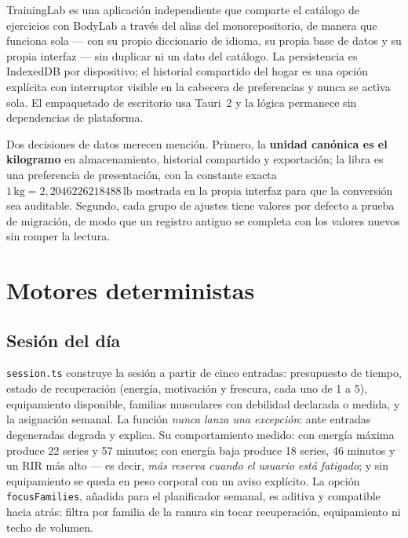 \documentclass[conference]{IEEEtran}
\newcommand{\code}[1]{\texttt{\small #1}}
\begin{document}
TrainingLab es una aplicaci\'on independiente que comparte el cat\'alogo de
ejercicios con BodyLab a trav\'es del alias del monorepositorio, de manera que
funciona sola --- con su propio diccionario de idioma, su propia base de datos y
su propia interfaz --- sin duplicar ni un dato del cat\'alogo. La persistencia es
IndexedDB por dispositivo; el historial compartido del hogar es una opci\'on
expl\'icita con interruptor visible en la cabecera de preferencias y nunca se
activa sola. El empaquetado de escritorio usa Tauri~2 y la l\'ogica permanece
sin dependencias de plataforma.

Dos decisiones de datos merecen menci\'on. Primero, la \textbf{unidad can\'onica
es el kilogramo} en almacenamiento, historial compartido y exportaci\'on; la
libra es una preferencia de presentaci\'on, con la constante exacta
$1\,\text{kg} = 2{,}2046226218488\,\text{lb}$ mostrada en la propia interfaz
para que la conversi\'on sea auditable. Segundo, cada grupo de ajustes tiene
valores por defecto a prueba de migraci\'on, de modo que un registro antiguo se
completa con los valores nuevos sin romper la lectura.

\section{Motores deterministas}

\subsection{Sesi\'on del d\'ia}
\code{session.ts} construye la sesi\'on a partir de cinco entradas: presupuesto
de tiempo, estado de recuperaci\'on (energ\'ia, motivaci\'on y frescura, cada uno
de 1 a 5), equipamiento disponible, familias musculares con debilidad declarada
o medida, y la asignaci\'on semanal. La funci\'on \emph{nunca lanza una
excepci\'on}: ante entradas degeneradas degrada y explica. Su comportamiento
medido: con energ\'ia m\'axima produce 22 series y 57 minutos; con energ\'ia baja
produce 18 series, 46 minutos y un RIR m\'as alto --- es decir, \emph{m\'as
reserva cuando el usuario est\'a fatigado}; y sin equipamiento se queda en peso
corporal con un aviso expl\'icito. La opci\'on \code{focusFamilies}, a\~nadida
para el planificador semanal, es aditiva y compatible hacia atr\'as: filtra por
familia de la ranura sin tocar recuperaci\'on, equipamiento ni techo de volumen.
\end{document}
